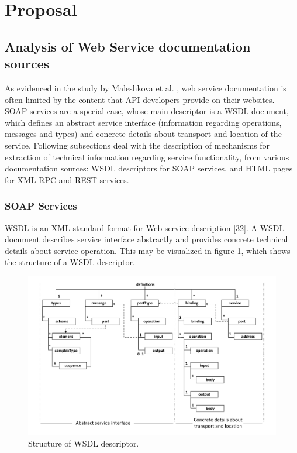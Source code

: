 \section{Proposal}
\label{proposal}

\subsection{Analysis of Web Service documentation sources}
\label{subsec:analysis-ws-doc}
As evidenced in the study by Maleshkova et al. \cite{Maleshkova:2010}, web service documentation is often limited by the content that API developers provide on their websites. SOAP services are a special case, whose main descriptor is a WSDL document, which defines an abstract service interface (information regarding operations, messages and types) and concrete details about transport and location of the service. Following subsections deal with the description of mechanisms for extraction of technical information regarding service functionality, from various documentation sources: WSDL descriptors for SOAP services, and HTML pages for XML-RPC and REST services.

\subsubsection{SOAP Services}
\label{subsubsec:soap}
WSDL is an XML standard format for Web service description [32]. A WSDL document describes service interface abstractly and provides concrete technical details about service operation. This may be visualized in figure \ref{wsdl-Structure}, which shows the structure of a WSDL descriptor.

\begin{figure}
\includegraphics[scale=0.40]{images/wsdl-structure-en}

\caption{Structure of WSDL descriptor.}
\label{wsdl-Structure}
\end{figure}

